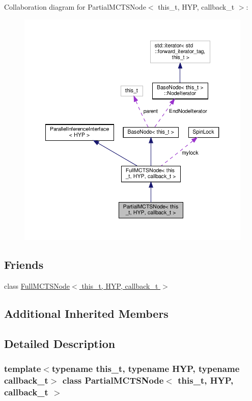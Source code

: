 Collaboration diagram for Partial\+M\+C\+T\+S\+Node$<$ this\+\_\+t, H\+YP, callback\+\_\+t $>$\+:
\nopagebreak
\begin{figure}[H]
\begin{center}
\leavevmode
\includegraphics[width=350pt]{class_partial_m_c_t_s_node__coll__graph}
\end{center}
\end{figure}
\subsection*{Friends}
\begin{DoxyCompactItemize}
\item 
class \hyperlink{class_partial_m_c_t_s_node_a6f119b2294000202fb5eaa562a7aa52b}{Full\+M\+C\+T\+S\+Node$<$ this\+\_\+t, H\+Y\+P, callback\+\_\+t $>$}
\end{DoxyCompactItemize}
\subsection*{Additional Inherited Members}


\subsection{Detailed Description}
\subsubsection*{template$<$typename this\+\_\+t, typename H\+YP, typename callback\+\_\+t$>$\newline
class Partial\+M\+C\+T\+S\+Node$<$ this\+\_\+t, H\+Y\+P, callback\+\_\+t $>$}

